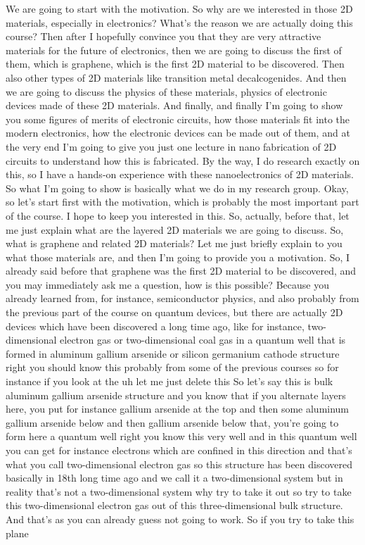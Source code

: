 We are going to start with the motivation. So why are we interested in those 2D materials, especially in electronics? What's the reason we are actually doing this course? Then after I hopefully convince you that they are very attractive materials for the future of electronics, then we are going to discuss the first of them, which is graphene, which is the first 2D material to be discovered. Then also other types of 2D materials like transition metal decalcogenides. And then we are going to discuss the physics of these materials, physics of electronic devices made of these 2D materials. And finally, and finally I'm going to show you some figures of merits of electronic circuits, how those materials fit into the modern electronics, how the electronic devices can be made out of them, and at the very end I'm going to give you just one lecture in nano fabrication of 2D circuits to understand how this is fabricated. By the way, I do research exactly on this, so I have a hands-on experience with these nanoelectronics of 2D materials. So what I'm going to show is basically what we do in my research group. Okay, so let's start first with the motivation, which is probably the most important part of the course. I hope to keep you interested in this. So, actually, before that, let me just explain what are the layered 2D materials we are going to discuss. So, what is graphene and related 2D materials? Let me just briefly explain to you what those materials are, and then I'm going to provide you a motivation. So, I already said before that graphene was the first 2D material to be discovered, and you may immediately ask me a question, how is this possible? Because you already learned from, for instance, semiconductor physics, and also probably from the previous part of the course on quantum devices, but there are actually 2D devices which have been discovered a long time ago, like for instance, two-dimensional electron gas or two-dimensional coal gas in a quantum well that is formed in aluminum gallium arsenide or silicon germanium cathode structure right you should know this probably from some of the previous courses so for instance if you look at the uh let me just delete this So let's say this is bulk aluminum gallium arsenide structure and you know that if you alternate layers here, you put for instance gallium arsenide at the top and then some aluminum gallium arsenide below and then gallium arsenide below that, you're going to form here a quantum well right you know this very well and in this quantum well you can get for instance electrons which are confined in this direction and that's what you call two-dimensional electron gas so this structure has been discovered basically in 18th long time ago and we call it a two-dimensional system but in reality that's not a two-dimensional system why try to take it out so try to take this two-dimensional electron gas out of this three-dimensional bulk structure. And that's as you can already guess not going to work. So if you try to take this plane 